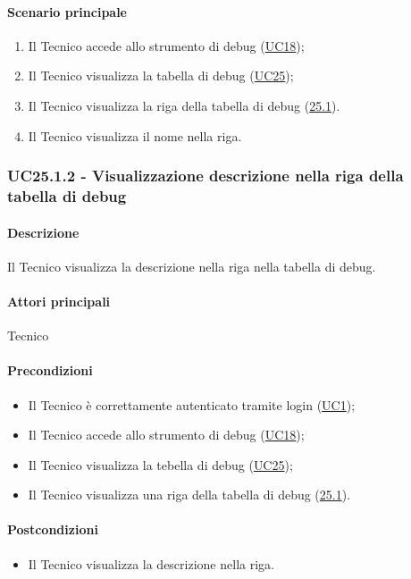 \paragraph*{Scenario principale}
\begin{enumerate}
  \item Il Tecnico accede allo strumento di debug (\hyperref[UC18]{UC18});
  \item Il Tecnico visualizza la tabella di debug (\hyperref[UC25]{UC25});
  \item Il Tecnico visualizza la riga della tabella di debug (\hyperref[UC25poin1]{25.1}).
  \item Il Tecnico visualizza il nome nella riga.
\end{enumerate}


\subsubsection{UC25.1.2 - Visualizzazione descrizione nella riga della tabella di debug}\label{UC25point1point2}
\paragraph*{Descrizione}
Il Tecnico visualizza la descrizione nella riga nella tabella di debug.

\paragraph*{Attori principali}
Tecnico

\paragraph*{Precondizioni}
\begin{itemize}
  \item Il Tecnico è correttamente autenticato tramite login (\hyperref[UC1]{UC1});
  \item Il Tecnico accede allo strumento di debug (\hyperref[UC18]{UC18});
  \item Il Tecnico visualizza la tebella di debug (\hyperref[UC25]{UC25});
  \item Il Tecnico visualizza una riga della tabella di debug (\hyperref[25point1]{25.1}).
\end{itemize}

\paragraph*{Postcondizioni}
\begin{itemize}
  \item Il Tecnico visualizza la descrizione nella riga.
\end{itemize}

